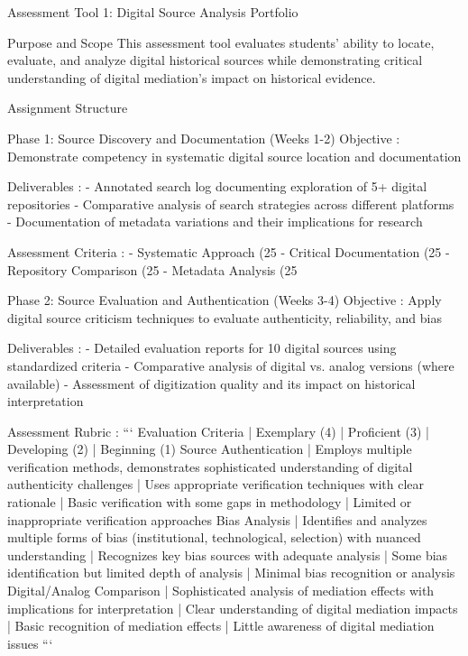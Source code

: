 \begin{appendices}
   Assessment Tool 1: Digital Source Analysis Portfolio

    Purpose and Scope
This assessment tool evaluates students' ability to locate, evaluate, and analyze digital historical sources while demonstrating critical understanding of digital mediation's impact on historical evidence.

    Assignment Structure

     Phase 1: Source Discovery and Documentation (Weeks 1-2)
 Objective : Demonstrate competency in systematic digital source location and documentation

 Deliverables :
- Annotated search log documenting exploration of 5+ digital repositories
- Comparative analysis of search strategies across different platforms
- Documentation of metadata variations and their implications for research

 Assessment Criteria :
-  Systematic Approach  (25%
-  Critical Documentation  (25%
-  Repository Comparison  (25%
-  Metadata Analysis  (25%

     Phase 2: Source Evaluation and Authentication (Weeks 3-4)
 Objective : Apply digital source criticism techniques to evaluate authenticity, reliability, and bias

 Deliverables :
- Detailed evaluation reports for 10 digital sources using standardized criteria
- Comparative analysis of digital vs. analog versions (where available)
- Assessment of digitization quality and its impact on historical interpretation

 Assessment Rubric :
```
Evaluation Criteria | Exemplary (4) | Proficient (3) | Developing (2) | Beginning (1)
Source Authentication | Employs multiple verification methods, demonstrates sophisticated understanding of digital authenticity challenges | Uses appropriate verification techniques with clear rationale | Basic verification with some gaps in methodology | Limited or inappropriate verification approaches
Bias Analysis | Identifies and analyzes multiple forms of bias (institutional, technological, selection) with nuanced understanding | Recognizes key bias sources with adequate analysis | Some bias identification but limited depth of analysis | Minimal bias recognition or analysis
Digital/Analog Comparison | Sophisticated analysis of mediation effects with implications for interpretation | Clear understanding of digital mediation impacts | Basic recognition of mediation effects | Little awareness of digital mediation issues
```


\end{appendices}
